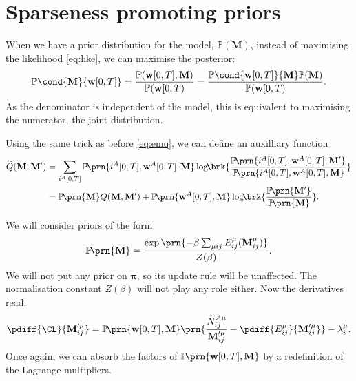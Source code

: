 \documentclass[12pt]{article}
\newcommand{\pib}{\boldsymbol{\pi}}
\newcommand{\w}{\mathbf{w}}
\newcommand{\M}{\mathbf{M}}
\newcommand{\pr}{\mathbb{P}}
\begin{document}
\section{Sparseness promoting priors \label{sec:priors}}

When we have a prior distribution for the model, $\pr(\M)$, instead of maximising the likelihood \eqref{eq:like}, we can maximise the posterior:
%
\begin{equation}\label{eq:posterior}
  \pr\cond{\M}{\w[0,T]} = \frac{ \pr(\w[0,T],\M) }{ \pr(\w[0,T) } = \frac{ \pr\cond{\w[0,T]}{\M} \pr(\M) }{ \pr(\w[0,T) }.
\end{equation}
%
As the denominator is independent of the model, this is equivalent to maximising the numerator, \ie the joint distribution.

Using the same trick as before \eqref{eq:emq}, we can define an auxilliary function
%
\begin{equation}\label{eq:emqprior}
\begin{aligned}
  \widetilde{Q}(\M,\M') &= \sum_{i^A[0,T]} \pr\!\prn{i^A[0,T],\w^A[0,T],\M} \log\!\! \brk{
      \frac{ \pr\!\prn{i^A[0,T],\w^A[0,T],\M'} }{ \pr\!\prn{i^A[0,T],\w^A[0,T],\M} } }\\
      &= \pr\!\prn{\M} Q(\M,\M') + \pr\!\prn{\w^A[0,T],\M} \log\!\! \brk{
      \frac{ \pr\!\prn{\M'} }{ \pr\!\prn{\M} } }.
\end{aligned}
\end{equation}
%

We will consider priors of the form
%
\begin{equation}\label{eq:priorsum}
  \pr\!\prn{\M} = \frac{\exp\prn{-\beta\sum_{\mu ij}E^\mu_{ij}(\M^\mu_{ij})}}{Z(\beta)}.
\end{equation}
%
We will not put any prior on $\pib$, so its update rule will be unaffected.
The normalisation constant $Z(\beta)$ will not play any role either.
Now the derivatives read:
%
\begin{equation}\label{eq:multidiffs}
  \pdiff{\CL}{\M'^\mu_{ij}} 
    = \pr\!\prn{\w[0,T],\M} \prn{ \frac{ \widetilde{N}^{A\mu}_{ij} }{ \M'^\mu_{ij} }  - \pdiff{E^\mu_{ij}}{\M'^\mu_{ij}} }- \lambda^\mu_{i}.
\end{equation}
%
Once again, we can absorb the factors of $\pr\!\prn{\w[0,T],\M}$ by a redefinition of the Lagrange multipliers.





\end{document}
